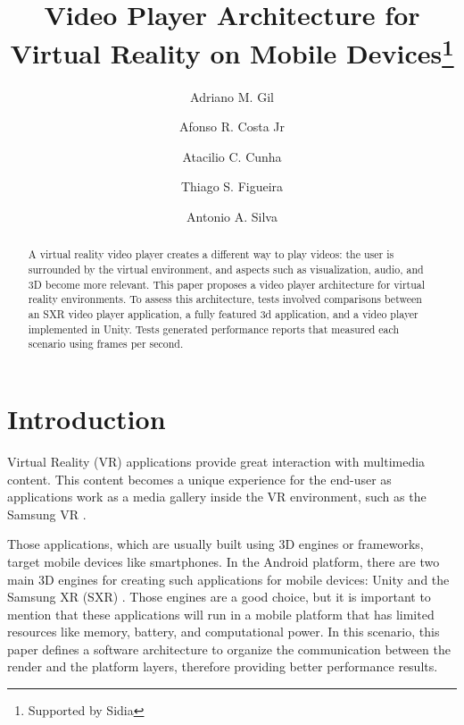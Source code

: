 \documentclass[runningheads]{llncs}
\begin{document}
%
\title{Video Player Architecture for Virtual Reality on Mobile Devices\thanks{Supported by Sidia}}
%
%
\author{Adriano M. Gil \and
Afonso R. Costa Jr \and
Atacilio C. Cunha \and
Thiago S. Figueira \and
Antonio A. Silva}


%
%
%
\maketitle              %
%
\begin{abstract}
A virtual reality video player creates a different way to play videos: the user is surrounded by the virtual environment, and aspects such as visualization, audio, and 3D become more relevant. This paper proposes a video player architecture for virtual reality environments.  To assess this architecture, tests involved comparisons between an SXR video player application, a fully featured 3d application, and a video player implemented in Unity. Tests generated performance reports that measured each scenario using frames per second.

\end{abstract}
%
%
%
\section{Introduction}
Virtual Reality (VR) applications provide great interaction with multimedia content. This content becomes a unique experience for the end-user as applications work as a media gallery inside the VR environment, such as the Samsung VR \cite{SVR}.

Those applications, which are usually built using 3D engines or frameworks, target mobile devices like smartphones. In the Android platform, there are two main 3D engines for creating such applications for mobile devices: Unity \cite{Unity} and the Samsung XR (SXR) \cite{SXR}. Those engines are a good choice, but it is important to mention that these applications will run in a mobile platform that has limited resources like memory, battery, and computational power. In this scenario, this paper defines a software architecture to organize the communication between the render and the platform layers, therefore providing better performance results.
\end{document}
